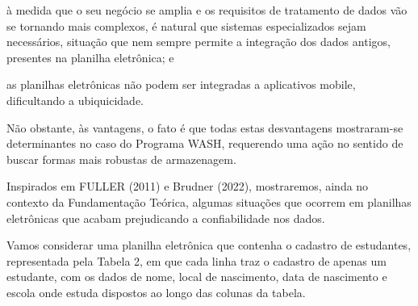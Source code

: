 \documentclass[
12pt,		%
openright,	%
twoside,  %
a4paper,			%
chapter=TITLE,		%
english,			%
french,				%
spanish,			%
brazil				%
]{USPSC-classe/USPSC}
\begin{document}
\begin{alineas}
\item \`a medida que o seu \textquotedbl  neg\'ocio \textquotedbl  se amplia e os requisitos de tratamento de dados v\~ao se tornando mais complexos, \'e natural que sistemas especializados sejam necess\'arios, situa\c{c}\~ao que nem sempre permite a integra\c{c}\~ao dos dados antigos, presentes na planilha eletr\^onica; e
\item as planilhas eletr\^onicas n\~ao podem ser integradas a aplicativos mobile, dificultando a ubiquicidade.
\end{alineas}

N\~ao obstante, \`as vantagens, o fato \'e que todas estas desvantagens mostraram-se determinantes no caso do Programa WASH, requerendo uma a\c{c}\~ao no sentido de buscar formas mais robustas de armazenagem.

















Inspirados em  FULLER (2011) e  Brudner (2022), mostraremos, ainda no contexto da Fundamenta\c{c}\~ao Te\'orica, algumas situa\c{c}\~oes que ocorrem em planilhas eletr\^onicas que acabam prejudicando a confiabilidade nos dados.

















Vamos considerar uma planilha  eletr\^onica que contenha o cadastro de estudantes, representada pela Tabela 2, em que cada linha traz o cadastro de apenas um estudante, com os dados de nome, local de nascimento, data de nascimento e escola onde estuda dispostos ao longo das colunas da tabela.
\end{document}
